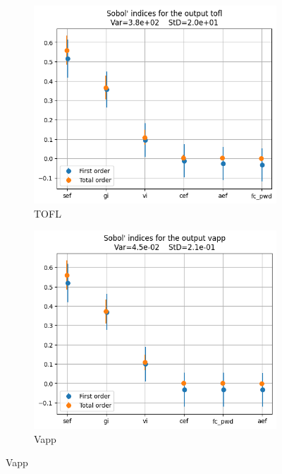 \documentclass[a4paper, 11pt]{article}
\begin{document}
\begin{figure}[H]
    \vspace{10pt} %

    \begin{subfigure}[b]{0.45\textwidth}
        \includegraphics[width=\textwidth]{Images_Ayoub/Problem2/UseCase2/Sobol_Indices/tofl.png}
        \caption{TOFL}
        \label{fig:tofl}
    \end{subfigure}
    \hfill
    \begin{subfigure}[b]{0.45\textwidth}
        \includegraphics[width=\textwidth]{Images_Ayoub/Problem2/UseCase2/Sobol_Indices/vapp.png}
        \caption{Vapp}
        \label{fig:vapp}
    \end{subfigure}


\end{figure}
\end{document}
